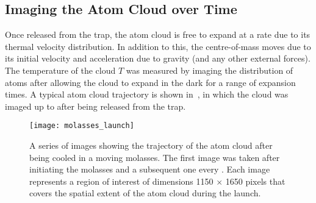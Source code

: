 \subsection{Imaging the Atom Cloud over Time}\label{subsec:molasses_imaging}
Once released from the trap, the atom cloud is free to expand at a
rate due to its
thermal velocity distribution. In addition to this, the centre-of-mass
moves due to its initial velocity and acceleration due to gravity
(and any other external forces).
The temperature of the cloud $T$ was measured by imaging the
distribution of atoms after allowing the cloud to expand in the dark
for a range of expansion times. A typical atom cloud trajectory is
shown in~, in which the cloud was imaged
up to  after being released from the trap.

\begin{figure}[!htbp]
  \centering
  \texttt{[image: molasses\_launch]}
  \caption[Atom cloud position after launching in a moving molasses]{A series of images showing the trajectory of the atom cloud after being cooled in a moving molasses. The first image was taken  after initiating the molasses and a subsequent one every . Each image represents a region of interest of dimensions 1150 \(\times\) 1650 pixels that covers the spatial extent of the atom cloud during the launch.}
  \label{fig:molasses_launch}
\end{figure}
